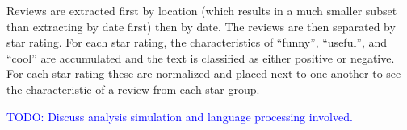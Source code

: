 Reviews are extracted first by location (which results in a much smaller subset than extracting by date first) then by date. The reviews are then separated by star rating. For each star rating, the characteristics of ``funny'', ``useful'', and ``cool'' are accumulated and the text is classified as either positive or negative. For each star rating these are normalized and placed next to one another to see the characteristic of a review from each star group.

\subsubsubsection{\textcolor{blue}{ TODO: Come up with a third kernel.}}
\textcolor{blue}{ TODO: Discuss analysis simulation and language processing involved.}
